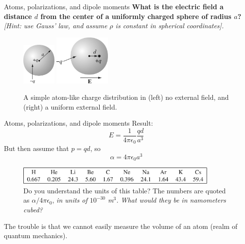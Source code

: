 \documentclass{beamer}
\begin{document}
\begin{frame}{Atoms, polarizations, and dipole moments}
\textbf{What is the electric field a distance $d$ from the center of a uniformly charged sphere of radius $a$?} \textit{[Hint: use Gauss' law, and assume $\rho$ is constant in spherical coordinates].} \\ \vspace{2cm}
\begin{figure}
\centering
\includegraphics[width=0.15\textwidth]{figures/4_1.jpg} \hspace{1cm}
\includegraphics[width=0.25\textwidth]{figures/4_2.jpg}
\caption{\label{fig:spheres} A simple atom-like charge distribution in (left) no external field, and (right) a uniform external field.}
\end{figure}
\end{frame}

\begin{frame}{Atoms, polarizations, and dipole moments}
Result:
\begin{equation}
E = \frac{1}{4\pi \epsilon_0}\frac{qd}{a^3}
\end{equation}
But then assume that $p = qd$, so
\begin{equation}
\alpha = 4\pi\epsilon_0 a^3
\end{equation}
\begin{figure}
\centering
\includegraphics[width=10cm]{figures/tab4_1.jpg}
\caption{\label{tab:alpha} Do you understand the units of this table?  The numbers are quoted as $\alpha/4\pi\epsilon_0$, \textit{in units of $10^{-30}$ m$^3$.  What would they be in namometers cubed?}}
\end{figure}
The trouble is that we cannot easily measure the volume of an atom (realm of quantum mechanics).
\end{frame}
\end{document}
